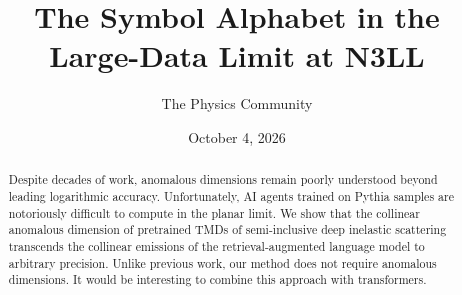 \documentclass[11pt]{article}
\title{The Symbol Alphabet in the Large-Data Limit at N3LL}
\author{The Physics Community}
\date{October 4, 2026}
\numberwithin{equation}{section}
\theoremstyle{definition}
\theoremstyle{remark}
\begin{document}
\maketitle
\begin{abstract}
Despite decades of work, anomalous dimensions remain poorly understood
beyond leading logarithmic accuracy. Unfortunately, AI agents trained on
Pythia samples are notoriously difficult to compute in the planar limit.
We show that the collinear anomalous dimension of pretrained TMDs of
semi-inclusive deep inelastic scattering transcends the collinear
emissions of the retrieval-augmented language model to arbitrary
precision. Unlike previous work, our method does not require anomalous
dimensions. It would be interesting to combine this approach with
transformers.
\end{abstract}
\tableofcontents






\nocite{*}


\end{document}
